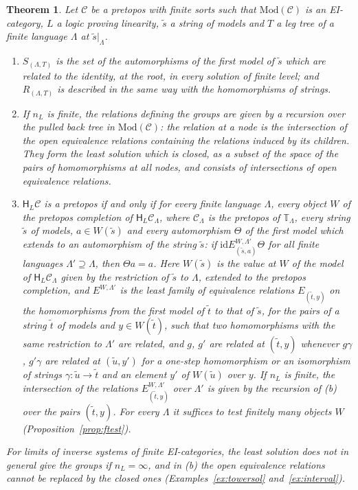 \documentclass[11pt]{amsart}
\newtheorem{thm}{Theorem}[section]
\theoremstyle{definition}
\newcommand{\Mod}{\mathrm{Mod}}
\newcommand{\HH}{\mathsf H}
\newcommand{\cC}{\mathcal C}
\newcommand{\bT}{\mathbb T}
\newcommand{\id}{\mathrm{id}}
\begin{document}
\begin{thm}\label{thm:F}
Let $\cC$ be a pretopos with finite sorts such that $\Mod(\cC)$ is an
EI-category, $L$ a logic proving linearity, $\tilde s$ a string of
models and $T$ a leg tree of a finite language $\Lambda$ at $\tilde
s|_\Lambda$.
\begin{enumerate}
\item[(a)] $S_{(\Lambda,T)}$ is the set of the automorphisms of the
first model of $\tilde s$ which are related to the identity, at the
root, in every solution of finite level; and $R_{(\Lambda,T)}$ is
described in the same way with the homomorphisms of strings.
\item[(b)] If $n_L$ is finite, the relations defining the groups are
given by a recursion over the pulled back tree in $\Mod(\cC)$: the
relation at a node is the intersection of the open equivalence
relations containing the relations induced by its children. They form
the least solution which is closed, as a subset of the space of the
pairs of homomorphisms at all nodes, and consists of intersections of
open equivalence relations.
\item[(c)] $\HH_L\cC$ is a pretopos if and only
if for every finite language $\Lambda$, every object $W$ of the
pretopos completion of $\HH_L\cC_\Lambda$, where $\cC_\Lambda$ is the
pretopos of $\bT_\Lambda$, every string $\tilde s$ of models, $a\in
W(\tilde s)$ and every automorphism $\Theta$ of the first model which
extends to an automorphism of the string $\tilde s$: if
$\id\mathrel{E^{W,\Lambda'}_{(\tilde s,a)}}\Theta$ for all finite
languages $\Lambda'\supseteq\Lambda$, then $\Theta a=a$. Here
$W(\tilde s)$ is the value at $W$ of the model of
$\HH_L\cC_\Lambda$ given by the restriction of $\tilde s$ to
$\Lambda$, extended to the pretopos completion, and $E^{W,\Lambda'}$
is the least family of equivalence relations $E_{(\tilde t,y)}$ on
the homomorphisms from the first model of $\tilde t$ to that of
$\tilde s$, for the pairs of a string $\tilde t$ of models and $y\in
W(\tilde t)$, such that two homomorphisms with the same restriction
to $\Lambda'$ are related, and $g$, $g'$ are related at $(\tilde
t,y)$ whenever $g\gamma$, $g'\gamma$ are related at $(\tilde u,y')$
for a one-step homomorphism or an isomorphism of strings
$\gamma\colon\tilde u\to\tilde t$ and an element $y'$ of $W(\tilde
u)$ over $y$. If $n_L$ is finite, the intersection of the relations
$E^{W,\Lambda'}_{(\tilde t,y)}$ over $\Lambda'$ is given by the
recursion of \emph{(b)} over the pairs $(\tilde t,y)$. For every
$\Lambda$ it suffices to test finitely many objects $W$
\textup{(Proposition~\ref{prop:ftest})}.
\end{enumerate}
For limits of inverse systems of finite EI-categories, the least
solution does not in general give the groups if $n_L=\infty$, and in \emph{(b)}
the open equivalence relations cannot be replaced by the closed ones
\textup{(Examples~\ref{ex:towersol} and~\ref{ex:interval})}.
\end{thm}
\end{document}
